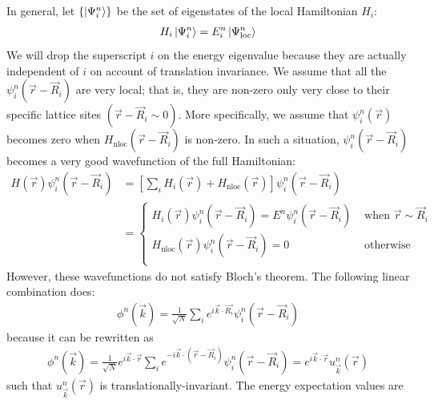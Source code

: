 \documentclass{article}
\begin{document}
In general, let $\left\{\ket{\Psi^n_i}\right\}$ be the set of eigenstates of the local Hamiltonian \(H_i\):
\begin{equation}\begin{aligned}
	H_i \ket{\Psi_i^n} = E^n_i\ket{\Psi_\text{loc}^n}
\end{aligned}\end{equation}
We will drop the superscript $i$ on the energy eigenvalue because they are actually independent of $i$ on account of translation invariance.
We assume that all the \(\psi_i^n(\vec r - \vec R_i)\) are very local; that is, they are non-zero only very close to their specific lattice sites \(\left( \vec r - \vec R_i \sim 0 \right) \). More specifically, we assume that \(\psi_i^n(\vec r)\) becomes zero when $H_\text{nloc}(\vec r - \vec R_i)$ is non-zero. In such a situation, \(\psi_i^n(\vec r - \vec R_i)\) becomes a very good wavefunction of the full Hamiltonian:
\begin{equation}\begin{aligned}
	H(\vec r)\psi_i^n(\vec r - \vec R_i) &= \left[\sum_i H_i(\vec r) + H_\text{nloc}(\vec r)\right] \psi_i^n(\vec r - \vec R_i)\\
					   &= \begin{cases}
						   H_i(\vec r)\psi_i^n(\vec r - \vec R_i) = E^n\psi_i^n(\vec r - \vec R_i) & \text{ when }\vec r \sim \vec R_i\\
						   H_\text{nloc}(\vec r) \psi_i^n(\vec r - \vec R_i) = 0 & \text{ otherwise }\\
	\end{cases}
\end{aligned}\end{equation}
However, these wavefunctions do not satisfy Bloch's theorem. The following linear combination does:
\begin{equation}\begin{aligned}
	\phi^n(\vec k) = \frac{1}{\sqrt N}\sum_{i}e^{i \vec{k}\cdot\vec{R_i}}\psi^n_i(\vec r - \vec R_i)
\end{aligned}\end{equation}
because it can be rewritten as
\begin{equation}\begin{aligned}
	\phi^n(\vec k) = \frac{1}{\sqrt N}e^{i \vec{k}\cdot\vec{r}}\sum_{i}e^{-i \vec{k}\cdot\left(\vec r-\vec R_i\right)}\psi^n_i(\vec r - \vec R_i) = e^{i \vec{k}\cdot\vec{r}} u^n_{\vec k}(\vec r)
\end{aligned}\end{equation}
such that \(u^n_{\vec k}(\vec r)\) is translationally-invariant. The energy expectation values are
\end{document}
